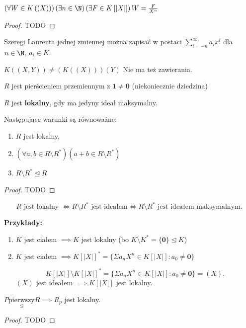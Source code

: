 \begin{fact}

	$\left(\forall W\in K\left( \left( X \right)  \right)  \right)\left(\exists n\in \N \right)\left(\exists F\in K\left[ \left| X \right|  \right]  \right) W = \frac{F}{X^{n}}   $
\end{fact}
\begin{proof}
	TODO
\end{proof} 
\begin{corollary}
Szeregi Laurenta jednej zmiennej można zapisać w postaci $\sum_{i = -n}^{\infty} a_i x^{i}$ dla $n\in \N$, $a_{i}\in K$.
\end{corollary}
\begin{remark}
	 $K\left( \left( X,Y \right)  \right) \neq \left( K\left( \left( X \right)  \right)  \right) \left( Y \right) $ 
	 Nie ma też zawierania.
\end{remark} 
\begin{context}

	$R$ jest pierścieniem przemiennym z $\mathbf{1} \neq \mathbf{0}$ (niekoniecznie dziedzina)
\end{context}
\begin{definition}[Lokalny]
	$R$ jest \textbf{lokalny}, gdy ma jedyny ideał maksymalny.
\end{definition} 
\begin{theorem}
	Następujące warunki są równoważne:
	\begin{enumerate}[label=\arabic*)]
		\item $R$ jest lokalny,
		\item $\left(\forall a,b \in R\setminus R^{\ast}  \right)\left( a+b \in R\setminus R^{\ast}  \right)  $ 
		\item $R\setminus R^{\ast} \unlhd R$
	\end{enumerate}
\end{theorem} 
\begin{proof}
	TODO
\end{proof} 
\begin{corollary}
	\[
	R \text{ jest lokalny }\iff R \setminus R^{\ast} \text{ jest ideałem} \iff R\setminus R^{\ast} \text{ jest ideałem maksymalnym}
	.\] 
\end{corollary}
\noindent \textbf{Przykłady:} 
\begin{enumerate}[label=\arabic*)]
	\item $K$ jest ciałem $\implies K$ jest lokalny (bo $K\setminus K^{\ast} = \{\mathbf{0}\} \unlhd K $)
	\item $K$ jest ciałem $\implies K\left[ \left| X \right|  \right]^{\ast} = \{\Sigma a_{n} X^{n} \in  K\left[ \left| X \right|  \right] : a_0 \neq \mathbf{0}\} $
	
		\[
		K\left[ \left| X \right|  \right] \setminus K\left[ \left| X \right|  \right] ^{\ast} = \{\Sigma a_{n} X^{n} \in  K\left[ \left| X \right|  \right] : a_0 \neq \mathbf{0}\} = \left( X \right)   
		.\] 
		$(X)$ jest ideałem $\implies K\left[ \left|  X \right|  \right] $ jest lokalny.
\end{enumerate}
\begin{theorem}
	$P \underset{\unlhd }{\text{pierwszy}} R \implies R_{p}$ jest lokalny.
	
\end{theorem} 
\begin{proof}
	TODO
\end{proof} 
